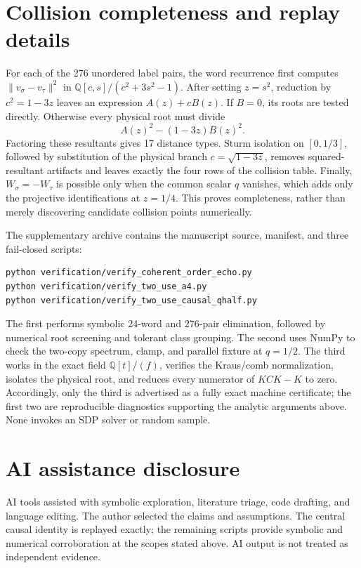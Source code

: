 \documentclass[11pt]{article}
\theoremstyle{definition}
\begin{document}
\section{Collision completeness and replay details}\label{app:certificate}

For each of the 276 unordered label pairs, the word recurrence first computes
$\lVert v_\sigma-v_\tau\rVert^2$ in
$\mathbb Q[c,s]/(c^2+3s^2-1)$.  After setting $z=s^2$, reduction by
$c^2=1-3z$ leaves an expression $A(z)+cB(z)$.  If $B=0$, its roots are tested
directly.  Otherwise every physical root must divide
\[
 A(z)^2-(1-3z)B(z)^2.
\]
Factoring these resultants gives 17 distance types.  Sturm isolation on
$[0,1/3]$, followed by substitution of the physical branch
$c=\sqrt{1-3z}$, removes squared-resultant artifacts and leaves exactly the
four rows of the collision table.  Finally, $W_\sigma=-W_\tau$ is possible
only when the common scalar $q$ vanishes, which adds only the projective
identifications at $z=1/4$.  This proves completeness, rather than merely
discovering candidate collision points numerically.

The supplementary archive contains the manuscript source, manifest, and
three fail-closed scripts:
\begin{verbatim}
python verification/verify_coherent_order_echo.py
python verification/verify_two_use_a4.py
python verification/verify_two_use_causal_qhalf.py
\end{verbatim}
The first performs symbolic 24-word and 276-pair elimination, followed by
numerical root screening and tolerant class grouping.  The second uses NumPy
to check the two-copy spectrum, clamp, and parallel fixture at $q=1/2$.  The
third works in the exact field $\mathbb Q[t]/(f)$, verifies the Kraus/comb
normalization, isolates the physical root, and reduces every numerator of
$KCK-K$ to zero.  Accordingly, only the third is advertised as a fully exact
machine certificate; the first two are reproducible diagnostics supporting
the analytic arguments above.  None invokes an SDP solver or random sample.

\section*{AI assistance disclosure}
AI tools assisted with symbolic exploration, literature triage, code drafting,
and language editing.  The author selected the claims and assumptions.  The
central causal identity is replayed exactly; the remaining scripts provide
symbolic and numerical corroboration at the scopes stated above.  AI output is
not treated as independent evidence.



\end{document}
